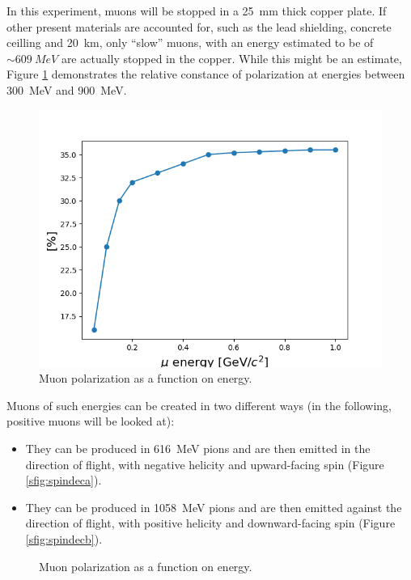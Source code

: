 In this experiment, muons will be stopped in a \SI{25}{mm} thick copper plate. If other present materials are accounted for, such as the lead shielding, concrete ceilling and \SI{20}{\km}, only ``slow'' muons, with an energy estimated to be of $\sim\SI{609}{MeV}$ are actually stopped in the copper. While this might be an estimate, Figure \ref{fig:mupol} demonstrates the relative constance of polarization at energies between \SI{300}{\MeV} and \SI{900}{\MeV}.

\begin{figure}[htbp]
\centering
\includegraphics[width=0.7\linewidth]{./fig/muonpol.png}
\caption{Muon polarization as a function on energy.}
\label{fig:mupol}
\end{figure}

Muons of such energies can be created in two different ways (in the following, positive muons will be looked at):

\begin{itemize}

\item They can be produced in \SI{616}{\MeV} pions and are then emitted in the direction of flight, with negative helicity and upward-facing spin (Figure \ref{sfig:spindeca}).

\item They can be produced in \SI{1058}{\MeV} pions and are then emitted against the direction of flight, with positive helicity and downward-facing spin (Figure \ref{sfig:spindecb}).

\end{itemize}

\begin{figure}[htbp]
\centering
\caption{Muon polarization as a function on energy.}
\end{figure}

